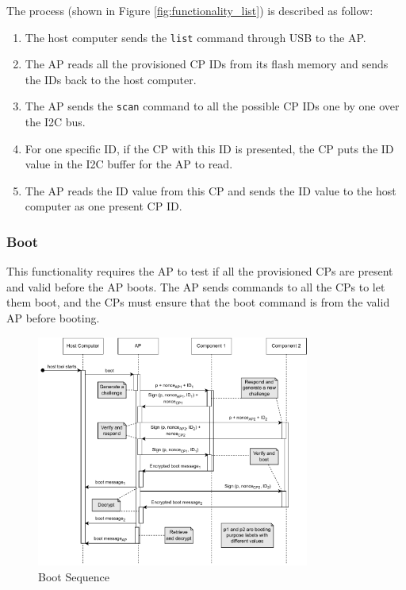 \documentclass[11pt,oneside,onecolumn,letterpaper]{article}
\begin{document}
	The process (shown in Figure \ref{fig:functionality_list}) is described as follow:
	
	\begin{enumerate}
		\item The host computer sends the \texttt{list} command through USB to the AP.
		\item The AP reads all the provisioned CP IDs from its flash memory and sends the IDs back to the host computer.
		\item The AP sends the \texttt{scan} command to all the possible CP IDs one by one over the I2C bus.
		\item For one specific ID,
		if the CP with this ID is presented,
		the CP puts the ID value in the I2C buffer for the AP to read.
		\item The AP reads the ID value from this CP and sends the ID value to the host computer as one present CP ID.
		
	\end{enumerate}
	
	\subsubsection{Boot}
	This functionality requires the AP to test if all the provisioned CPs are present and valid before the AP boots.
	The AP sends commands to all the CPs to let them boot,
	and the CPs must ensure that the boot command is from the valid AP before booting.
	
	\begin{figure}[h]
		\centering
		\includegraphics[width=0.8\textwidth]{pics/boot.pdf}
		\caption{Boot Sequence}
		\label{fig:functionality_boot}
	\end{figure}
	
\end{document}

